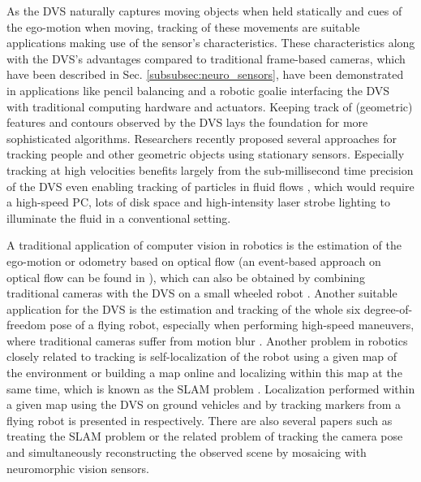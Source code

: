 As the \ac{DVS} naturally captures moving objects when held statically and cues of the ego-motion when moving, tracking of these movements are suitable applications making use of the sensor's characteristics.
These characteristics along with the \ac{DVS}'s advantages compared to traditional frame-based cameras, which have been described in Sec. \ref{subsubsec:neuro_sensors}, have been demonstrated in applications like pencil balancing \parencite{Conradt2009} and a robotic goalie \parencite{Delbruck2013} interfacing the \ac{DVS} with traditional computing hardware and actuators.
Keeping track of (geometric) features \parencite{Lagorce2015} and contours \parencite{Barranco2014} observed by the \ac{DVS} lays the foundation for more sophisticated algorithms.
Researchers recently proposed several approaches for tracking people \parencite{Schraml2010, Piatkowska2012} and other geometric objects \parencite{ReverterValeiras2016} using stationary sensors.
Especially tracking at high velocities \parencite{Saner2014} benefits largely from the sub-millisecond time precision of the \ac{DVS} even enabling tracking of particles in fluid flows \parencite{Drazen2011}, which would require a high-speed PC, lots of disk space and high-intensity laser strobe lighting to illuminate the fluid in a conventional setting.

A traditional application of computer vision in robotics is the estimation of the ego-motion or odometry based on optical flow (an event-based approach on optical flow can be found in \parencite{Benosman2014}), which can also be obtained by combining traditional cameras with the \ac{DVS} on a small wheeled robot \parencite{Censi2014}.
Another suitable application for the \ac{DVS} is the estimation and tracking of the whole six degree-of-freedom pose of a flying robot, especially when performing high-speed maneuvers, where traditional cameras suffer from motion blur \parencite{Mueggler2014}.
Another problem in robotics closely related to tracking is self-localization of the robot using a given map of the environment or building a map online and localizing within this map at the same time, which is known as the \ac{SLAM} problem \parencite{Thrun2005}.
Localization performed within a given map using the \ac{DVS} on ground vehicles and by tracking markers from a flying robot is presented in \textcites{Gallego2015}{Censi2013} respectively.
There are also several papers such as \textcites{Weikersdorfer2012}{Weikersdorfer2014} treating the \ac{SLAM} problem or the related problem of tracking the camera pose and simultaneously reconstructing the observed scene by mosaicing \parencite{Kim2014} with neuromorphic vision sensors.

